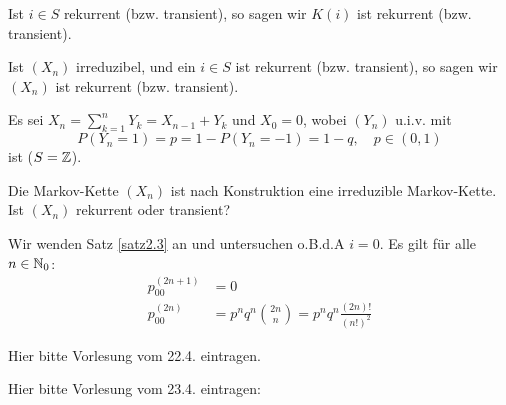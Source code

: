 \documentclass[a4paper,twoside,DIV15,BCOR12mm]{scrbook}
\begin{document}
\begin{bemerkung}
Ist $i\in S$ rekurrent (bzw. transient), so sagen wir $K(i)$ ist rekurrent (bzw. transient).

Ist $(X_n)$ irreduzibel, und ein $i\in S$ ist rekurrent (bzw. transient), so sagen wir $(X_n)$ ist rekurrent (bzw. transient).
\end{bemerkung}

\begin{beispiel}
Es sei $X_n=\sum_{k=1}^n Y_k = X_{n-1}+Y_k$ und $X_0=0$, wobei $(Y_n)$ u.i.v. mit \[P(Y_n=1)=p = 1 - P (Y_n=-1) =1-q,\quad p\in (0,1)\] ist ($S=\mathbb{Z}$).

\begin{center}
\end{center}
Die Markov-Kette $(X_n)$ ist nach Konstruktion eine irreduzible Markov-Kette. Ist $(X_n)$ rekurrent oder transient?

Wir wenden Satz \ref{satz2.3} an und untersuchen o.B.d.A $i=0$. Es gilt für alle $n\in \mathbb{N}_0$:
\begin{align*}
p_{00}^{(2n+1)} &= 0\\
p_{00}^{(2n)} &= p^nq^n \binom{2n}{n} = p^nq^n \frac{(2n)!}{(n!)^2}
\end{align*}
\end{beispiel}

\begin{centering}
\Large Hier bitte Vorlesung vom 22.4. eintragen.
\end{centering}

\begin{centering}
\Large Hier bitte Vorlesung vom 23.4. eintragen:
\end{centering}
\end{document}
